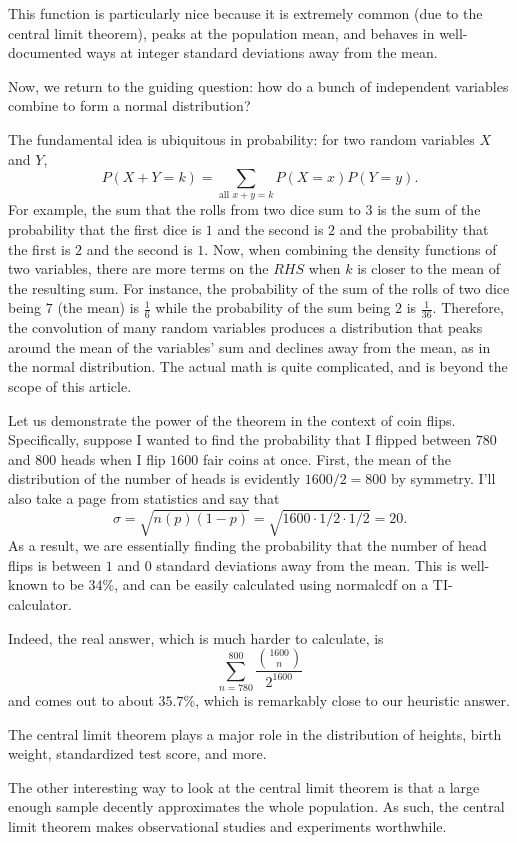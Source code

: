 \documentclass{article}
\begin{document}
This function is particularly nice because it is extremely common (due to the central limit theorem), peaks at the population mean, and behaves in well-documented ways at integer standard deviations away from the mean. 

Now, we return to the guiding question: how do a bunch of independent variables combine to form a normal distribution?

The fundamental idea is ubiquitous in probability: for two random variables $X$ and $Y$,
\[ P(X+Y=k) = \sum_{\text{all } x+ y = k} P(X=x)P(Y=y). \]
For example, the sum that the rolls from two dice sum to $3$ is the sum of the probability that the first dice is $1$ and the second is $2$ and the probability that the first is $2$ and the second is $1$. Now, when combining the density functions of two variables, there are more terms on the $RHS$ when $k$ is closer to the mean of the resulting sum. For instance, the probability of the sum of the rolls of two dice being $7$ (the mean) is $\frac{1}{6}$ while the probability of the sum being $2$ is $\frac{1}{36}$. Therefore, the convolution of many random variables produces a distribution that peaks around the mean of the variables' sum and declines away from the mean, as in the normal distribution. The actual math is quite complicated, and is beyond the scope of this article. 

Let us demonstrate the power of the theorem in the context of coin flips. Specifically, suppose I wanted to find the probability that I flipped between $780$ and $800$ heads when I flip $1600$ fair coins at once. First, the mean of the distribution of the number of heads is evidently $1600/2 = 800$ by symmetry. I'll also take a page from statistics and say that
\[ \sigma = \sqrt{n(p)(1-p)} = \sqrt{1600 \cdot 1/2 \cdot 1/2} = 20. \]
As a result, we are essentially finding the probability that the number of head flips is between $1$ and $0$ standard deviations away from the mean. This is well-known to be $34$\%, and can be easily calculated using normalcdf on a TI-calculator. 

Indeed, the real answer, which is much harder to calculate, is
\[ \sum_{n=780}^{800} \frac{\binom{1600}{n}}{2^{1600}} \]
and comes out to about $35.7$\%, which is remarkably close to our heuristic answer.

The central limit theorem plays a major role in the distribution of heights, birth weight, standardized test score, and more.

The other interesting way to look at the central limit theorem is that a large enough sample decently approximates the whole population. As such, the central limit theorem makes observational studies and experiments worthwhile. 
\end{document}
